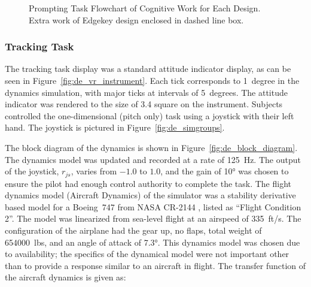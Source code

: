 \begin{figure}
    \medskip
    \caption{Prompting Task Flowchart of Cognitive Work for Each Design. Extra work of Edgekey design enclosed in dashed line box.}
    \label{fig:de_flowchart}
\end{figure}

\subsubsection{Tracking Task}
\label{sec:de_fdm}

The tracking task display was a standard attitude indicator display, as can be seen in Figure~\ref{fig:de_vr_instrument}.
Each tick corresponds to 1~degree in the dynamics simulation, with major ticks at intervals of 5~degrees.
The attitude indicator was rendered to the size of \SI{3.4}{\inch} square on the instrument.
Subjects controlled the one-dimensional (pitch only) task using a joystick with their left hand.
The joystick is pictured in Figure~\ref{fig:de_simgroups}.


The block diagram of the dynamics is shown in Figure~\ref{fig:de_block_diagram}.
The dynamics model was updated and recorded at a rate of \SI{125}{\hertz}.
The output of the joystick, $r_{js}$, varies from $-1.0$ to $1.0$, and the gain of \ang{10} was chosen to ensure the pilot had enough control authority to complete the task.
The flight dynamics model (Aircraft Dynamics) of the simulator was a stability derivative based model for a Boeing~747 from NASA CR-2144 \citep{heffley_aircraft_1972}, listed as ``Flight Condition 2''.
The model was linearized from sea-level flight at an airspeed of 335~ft/s.
The configuration of the airplane had the gear up, no flaps, total weight of \num{654000}~lbs, and an angle of attack of \ang{7.3}.
This dynamics model was chosen due to availability; the specifics of the dynamical model were not important other than to provide a response similar to an aircraft in flight.
The transfer function of the aircraft dynamics is given as:


